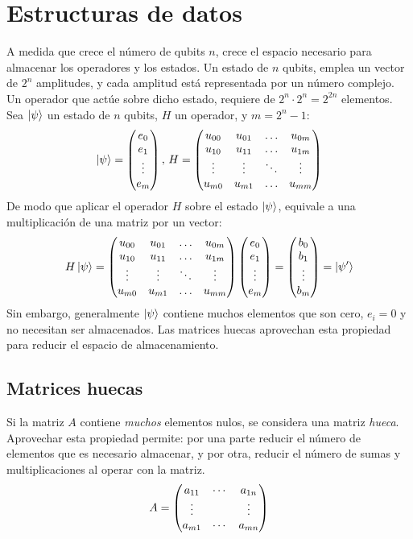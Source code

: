 \section{Estructuras de datos}
A medida que crece el número de qubits $n$, crece el espacio necesario para 
almacenar los operadores y los estados.
Un estado de $n$ qubits, emplea un vector de $2^{n}$ amplitudes, y cada amplitud 
está representada por un número complejo.  Un operador que actúe sobre dicho 
estado, requiere de $2^{n} \cdot 2^{n} = 2^{2n}$ elementos.  Sea $\ket{\psi}$ un 
estado de $n$ qubits, $H$ un operador, y $m = 2^{n}-1$:
%
$$ \ket{\psi} = \begin{pmatrix} e_0 \\ e_1 \\ \vdots \\ e_m \end{pmatrix},\, H =
	\begin{pmatrix}  u_{00} & u_{01} & \ldots & u_{0m} \\
		u_{10} & u_{11} & \ldots & u_{1m}\\
		\vdots & \vdots & \ddots & \vdots \\
		u_{m0} & u_{m1} & \ldots & u_{mm}\\
	 \end{pmatrix}
$$
%
De modo que aplicar el operador $H$ sobre el estado $\ket{\psi}$, equivale a una 
multiplicación de una matriz por un vector:
%
$$ H \ket{\psi} = \begin{pmatrix}  u_{00} & u_{01} & \ldots & u_{0m} \\
		u_{10} & u_{11} & \ldots & u_{1m}\\
		\vdots & \vdots & \ddots & \vdots \\
		u_{m0} & u_{m1} & \ldots & u_{mm}\\
	 \end{pmatrix}
	\begin{pmatrix} e_0 \\ e_1 \\ \vdots \\ e_m \end{pmatrix}
=
	\begin{pmatrix} b_0 \\ b_1 \\ \vdots \\ b_m \end{pmatrix} = \ket{\psi'}
$$
%
Sin embargo, generalmente $\ket{\psi}$ contiene muchos elementos que son cero, 
$e_i = 0$ y no necesitan ser almacenados. Las matrices huecas aprovechan esta 
propiedad para reducir el espacio de almacenamiento.

\subsection{Matrices huecas}

Si la matriz $A$ contiene \textit{muchos} elementos nulos, se considera una 
matriz \textit{hueca}. Aprovechar esta propiedad permite: por una parte reducir 
el número de elementos que es necesario almacenar, y por otra, reducir el número 
de sumas y multiplicaciones al operar con la matriz.
$$ A = \begin{pmatrix}  a_{11} & \cdots & a_{1n} \\
		\vdots &   & \vdots \\
		a_{m1} & \cdots & a_{mn}\\
	 \end{pmatrix}
$$

